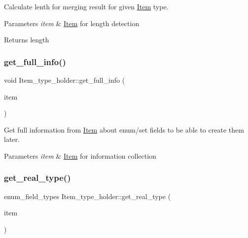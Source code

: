 Calculate lenth for merging result for given \mbox{\hyperlink{classItem}{Item}} type.


\begin{DoxyParams}{Parameters}
{\em item} & \mbox{\hyperlink{classItem}{Item}} for length detection\\
\hline
\end{DoxyParams}
\begin{DoxyReturn}{Returns}
length 
\end{DoxyReturn}
\mbox{\label{classItem__type__holder_a23713e2edd1acade849d36a8481461d4}} 
\subsubsection{\texorpdfstring{get\+\_\+full\+\_\+info()}{get\_full\_info()}}
{\footnotesize\ttfamily void Item\+\_\+type\+\_\+holder\+::get\+\_\+full\+\_\+info (\begin{DoxyParamCaption}\item[{\mbox{\hyperlink{classItem}{Item}} $\ast$}]{item }\end{DoxyParamCaption})\hspace{0.3cm}{\ttfamily [protected]}}

Get full information from \mbox{\hyperlink{classItem}{Item}} about enum/set fields to be able to create them later.


\begin{DoxyParams}{Parameters}
{\em item} & \mbox{\hyperlink{classItem}{Item}} for information collection \\
\hline
\end{DoxyParams}
\mbox{\label{classItem__type__holder_a69dd50259fdc25d5e6cd9c61f2d9fd20}} 
\subsubsection{\texorpdfstring{get\+\_\+real\+\_\+type()}{get\_real\_type()}}
{\footnotesize\ttfamily enum\+\_\+field\+\_\+types Item\+\_\+type\+\_\+holder\+::get\+\_\+real\+\_\+type (\begin{DoxyParamCaption}\item[{\mbox{\hyperlink{classItem}{Item}} $\ast$}]{item }\end{DoxyParamCaption})\hspace{0.3cm}{\ttfamily [static]}}

